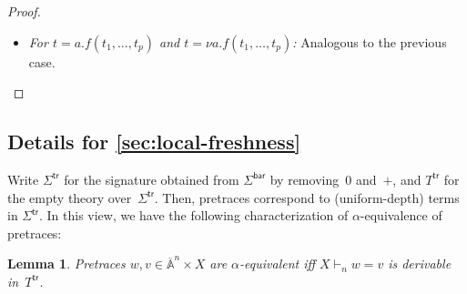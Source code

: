 \documentclass[11pt,a4paper]{amsart}
\newtheorem{lemma}[lemma]{Lemma}
\newcommand{\Br}{\mathsf{bar}}
\newcommand{\trc}{\mathsf{tr}}
\newcommand{\Names}{\mathbb{A}}
\newcommand{\barNames}{\overline{\Names}}
\theoremstyle{plain}
\numberwithin{equation}{section}
\newcommand{\+}[1]{\mathcal{#1}\xspace}
\theoremstyle{definition}
\begin{document}
\begin{proof}
\begin{enumerate}[wide]
\begin{itemize}
                    If \(d(f) = 1\), then
                    \begin{align*}
                        &q'([f(t_1, \ldots, t_p)]_{1 + n}) \\
                        =~&q'(\mu^{1, n}_X([f([t_1]_n, \ldots, [t_p]_n)]_1)) && \text{\cref{thm:multiplicationwithzero}} \\
                        =~&q([f([t_1]_n, \ldots, [t_p]_n)]_1) && \text{\cref{eq:qprimehasproperty}} \\
                        =~&q([s^n_X(f(t_1, \ldots, t_p)]_1) && \text{definition of } s^n_X \\
                        =~&\bar{q}([f(t_1, \ldots, t_p)]_{1 + n}) && \text{definition of } \bar{q}.
                    \end{align*}
                \item
                    \textit{For \(t = a.f(t_1, \ldots, t_p)\) and \(t = \nu a.f(t_1, \ldots, t_p)\):}
                    Analogous to the previous case.
            \end{itemize}
    \end{enumerate}

\end{proof}


\subsection*{Details for \cref{sec:local-freshness}}
Write $\Sigma^{\trc}$ for the signature obtained from $\Sigma^\Br$ by
removing~$0$ and~$+$, and $T^\trc$ for the empty theory
over~$\Sigma^\trc$. Then, pretraces correspond to (uniform-depth)
terms in $\Sigma^\trc$. In this view, we have the following
characterization of $\alpha$-equivalence of pretraces:

\begin{lemma}\label{lem:pretrace-alpha}
  Pretraces $w,v\in\barNames^n\times X$ are $\alpha$-equivalent iff
  $X\vdash_n w=v$ is derivable in~$T^\trc$.
\end{lemma}
\end{document}
